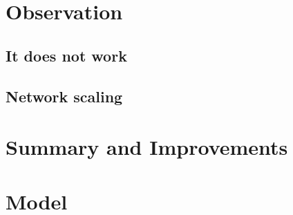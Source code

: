 \documentclass[12pt]{article}
\begin{document}
\section{Observation}
\subsection{It does not work}
\subsection{Network scaling} %



\section{Summary and Improvements}






\section{Model}
\end{document}
